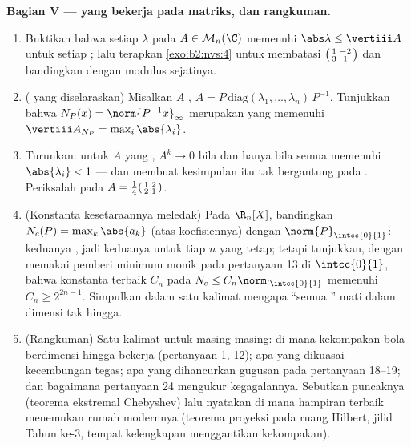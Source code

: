 \begin{problem}
\medskip
\noindent\textbf{Bagian V ---  yang bekerja pada matriks, dan
rangkuman.}
\begin{enumerate}[resume]
  \item Buktikan bahwa setiap  $\lambda$ pada $A \in
        \mathcal{M}_n(\C)$ memenuhi $\abs\lambda \leq
        \vertiii A$ untuk setiap ; lalu terapkan
        \cref{exo:b2:nvs:4} untuk membatasi 
        $\begin{psmallmatrix}1 & -2\\ 3 & 1\end{psmallmatrix}$
        dan bandingkan dengan modulus sejatinya.
  \item ( yang diselaraskan) Misalkan $A$ , $A =
        P\,\mathrm{diag}(\lambda_1, \dots, \lambda_n)\,P^{-1}$.
        Tunjukkan bahwa $N_P(x) = \norm{P^{-1}x}_\infty$ merupakan 
        yang  memenuhi $\vertiii A_{N_P} =
        \max_i\abs{\lambda_i}$.
  \item Turunkan: untuk $A$ yang , $A^k \to 0$ bila
        dan hanya bila semua  memenuhi $\abs{\lambda_i} <
        1$ --- dan  membuat kesimpulan itu tak
        bergantung pada . Periksalah pada $A =
        \frac14\begin{psmallmatrix}1 & 2\\ 2 &
        1\end{psmallmatrix}$.
  \item (Konstanta kesetaraannya meledak) Pada $\R_n[X]$, bandingkan
        $N_c(P) = \max_k \abs{a_k}$ (atas koefisiennya) dengan
        $\norm{P}_{\intcc{0}{1}}$: keduanya , jadi keduanya
         untuk tiap $n$ yang tetap; tetapi tunjukkan, dengan
        memakai pemberi minimum monik pada pertanyaan 13 di
        $\intcc{0}{1}$, bahwa konstanta terbaik $C_n$ pada $N_c \leq
        C_n\norm\cdot_{\intcc{0}{1}}$ memenuhi $C_n \geq
        2^{2n-1}$. Simpulkan dalam satu kalimat mengapa ``semua '' mati dalam dimensi tak hingga.
  \item (Rangkuman) Satu kalimat untuk masing-masing: di mana kekompakan
        bola berdimensi hingga bekerja (pertanyaan 1, 12); apa yang
        dikuasai kecembungan tegas; apa yang dihancurkan gugusan pada
        pertanyaan 18--19; dan bagaimana pertanyaan 24
        mengukur kegagalannya. Sebutkan puncaknya (teorema
        ekstremal Chebyshev) lalu nyatakan di mana hampiran terbaik
        menemukan rumah modernnya (teorema proyeksi pada ruang
        Hilbert, jilid Tahun ke-3, tempat kelengkapan menggantikan
        kekompakan).


\end{enumerate}
\end{problem}
